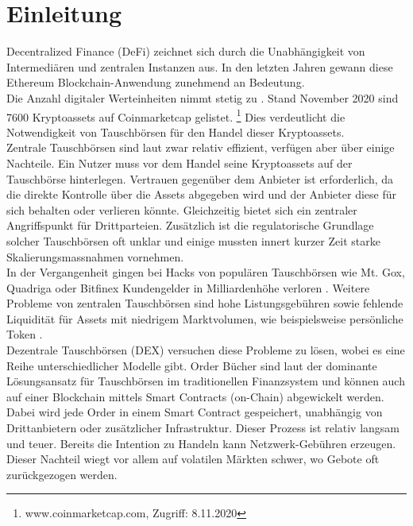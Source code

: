 \documentclass[12pt,a4paper,titlepage,oneside,english]{article}
\begin{document}
\section{Einleitung}

Decentralized Finance (DeFi) zeichnet sich durch die Unabhängigkeit von Intermediären und zentralen Instanzen aus. In den letzten Jahren gewann diese Ethereum Blockchain-Anwendung zunehmend an Bedeutung. \citep[vgl.][S.1]{Schaer2020}\\ Die Anzahl digitaler Werteinheiten %
nimmt stetig zu \citep{Joel2020}. Stand November 2020 sind 7600 Kryptoassets auf Coinmarketcap gelistet. \footnote{www.coinmarketcap.com, Zugriff: 8.11.2020} Dies verdeutlicht die Notwendigkeit von Tauschbörsen für den Handel dieser Kryptoassets.\\
Zentrale Tauschbörsen sind laut \citet[S.8]{Schaer2020} zwar relativ effizient, verfügen aber über einige Nachteile. Ein Nutzer muss vor dem Handel seine Kryptoassets auf der Tauschbörse hinterlegen. Vertrauen gegenüber dem Anbieter ist erforderlich, da die direkte Kontrolle über die Assets abgegeben wird und der Anbieter diese für sich behalten oder verlieren könnte. Gleichzeitig bietet sich ein zentraler Angriffspunkt für Drittparteien. Zusätzlich ist die regulatorische Grundlage solcher Tauschbörsen oft unklar und einige mussten innert kurzer Zeit starke Skalierungsmassnahmen vornehmen. \\ In der Vergangenheit gingen bei Hacks von populären Tauschbörsen wie Mt. Gox, Quadriga oder Bitfinex Kundengelder in Milliardenhöhe verloren \citep[S.1]{Angeris2019}. 
Weitere Probleme von zentralen Tauschbörsen sind hohe Listungsgebühren sowie fehlende Liquidität für  Assets mit niedrigem Marktvolumen, wie beispielsweise persönliche Token \citep{Joel2020}.\\
Dezentrale Tauschbörsen (DEX) versuchen diese Probleme zu lösen, wobei es eine Reihe unterschiedlicher Modelle gibt.
Order Bücher sind laut \citet[S.2]{Angeris2019} der dominante Lösungsansatz für Tauschbörsen im traditionellen Finanzsystem und können auch auf einer Blockchain mittels Smart Contracts (on-Chain) abgewickelt werden. \\
Dabei wird jede Order in einem Smart Contract gespeichert, unabhängig von Drittanbietern oder zusätzlicher Infrastruktur. Dieser Prozess  ist relativ langsam und teuer. Bereits die Intention zu Handeln kann Netzwerk-Gebühren erzeugen. Dieser Nachteil wiegt vor allem auf volatilen Märkten schwer, wo Gebote oft zurückgezogen werden. \citep[vgl.][S.9]{Schaer2020}\\
\end{document}
